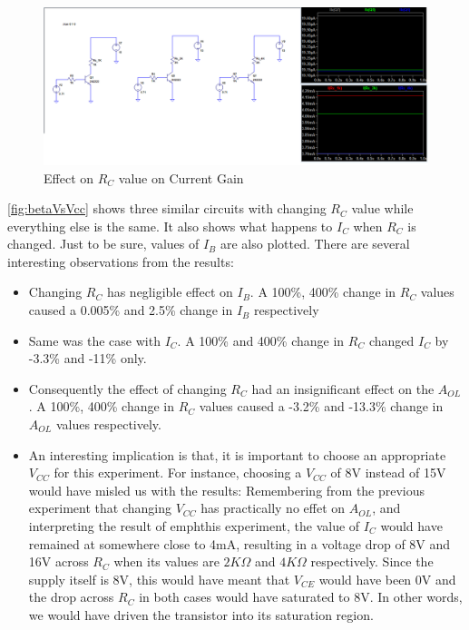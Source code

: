 	\begin{figure}[h!]
	\centering
	\includegraphics[width = \textwidth]{partHW/betaVsRc}
	\caption{Effect on $R_C$ value on Current Gain}
	\label{fig:betaVsRc}
	\end{figure}

\autoref{fig:betaVsVcc}  shows three similar circuits with changing $R_C$ value while everything else is the same. It also shows what happens to $I_C$ when $R_C$ is changed. Just to be sure, values of $I_B$ are also plotted. There are several interesting observations from the results:
	\begin{itemize}
	\item Changing $R_C$ has negligible effect on $I_B$. A 100\%, 400\% change in $R_C$ values caused a 0.005\% and 2.5\% change in $I_B$ respectively
	\item Same was the case with $I_C$. A 100\% and 400\% change in $R_C$ changed $I_C$ by -3.3\% and -11\% only.
	\item Consequently the effect of changing $R_C$ had an insignificant effect on the $A_{OL}$. A 100\%, 400\% change in $R_C$ values caused a -3.2\% and -13.3\% change in $A_{OL}$ values respectively.
	\item An interesting implication is that, it is important to choose an appropriate $V_{CC}$ for this experiment. For instance, choosing a $V_{CC}$ of 8V instead of 15V would have misled us with the results: Remembering from the previous experiment that changing $V_{CC}$ has practically no effet on $A_{OL}$, and interpreting the result of emph{this} experiment, the value of $I_C$ would have remained at somewhere close to 4mA, resulting in a voltage drop of 8V and 16V across $R_C$ when its values are $2K\Omega$ and $4K\Omega$ respectively. Since the supply itself is 8V, this would have meant that $V_{CE}$ would have been 0V and the drop across $R_C$ in both cases would have saturated to 8V. In other words, we would have driven the transistor into its saturation region.
	\end{itemize}

